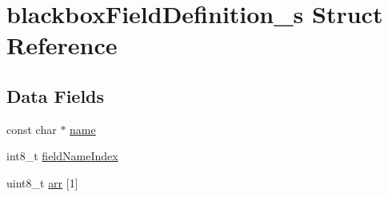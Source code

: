 \hypertarget{structblackboxFieldDefinition__s}{\section{blackbox\+Field\+Definition\+\_\+s Struct Reference}
\label{structblackboxFieldDefinition__s}
}
\subsection*{Data Fields}
\begin{DoxyCompactItemize}
\item 
const char $\ast$ \hyperlink{structblackboxFieldDefinition__s_ae59344846f0ec1176a4e5d9614bd6527}{name}
\item 
int8\+\_\+t \hyperlink{structblackboxFieldDefinition__s_a791ef6ce5e62808da2974cea600821c3}{field\+Name\+Index}
\item 
uint8\+\_\+t \hyperlink{structblackboxFieldDefinition__s_aec4b00cdd2a769170d845bdc45487f04}{arr} \mbox{[}1\mbox{]}
\end{DoxyCompactItemize}



